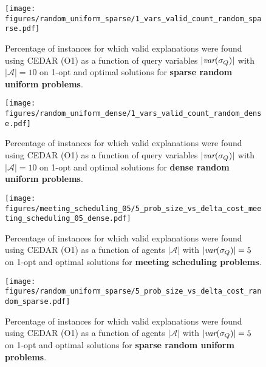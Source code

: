 \documentclass[twoside,11pt]{article}
\begin{document}
\begin{figure}[h]
\centering
\small
\texttt{[image: figures/random\_uniform\_sparse/1\_vars\_valid\_count\_random\_sparse.pdf]} \\ 
\vspace{-0.5em} 
\caption{Percentage of instances for which valid explanations were found using CEDAR (O1) as a function of query variables $|{\textit{var}(\sigma_Q)}|$  with $|\mathcal{A}| = 10$ on 1-opt and optimal solutions for \textbf{sparse random uniform problems}.}
\label{fig:1_results_percent_query_sparse}
\end{figure}

\begin{figure}[h]
\centering
\small
\texttt{[image: figures/random\_uniform\_dense/1\_vars\_valid\_count\_random\_dense.pdf]} \\ 
\vspace{-0.5em} 
\caption{Percentage of instances for which valid explanations were found using CEDAR (O1) as a function of query variables $|{\textit{var}(\sigma_Q)}|$ 
with $|\mathcal{A}| = 10$ on 1-opt and optimal solutions for \textbf{dense random uniform problems}.}
\label{fig:1_results_percent_query_dense}
\end{figure}




\begin{figure}[h]
\centering
\small
\texttt{[image: figures/meeting\_scheduling\_05/5\_prob\_size\_vs\_delta\_cost\_meeting\_scheduling\_05\_dense.pdf]} \\ 
\vspace{-0.5em} 
\caption{Percentage of instances for which valid explanations were found using CEDAR (O1) as a function of agents $|\mathcal{A}|$ with $|{\textit{var}(\sigma_Q)}| = 5$  on 1-opt and optimal solutions for \textbf{meeting scheduling problems}.}
\label{fig:5_results_percent_A_meeting}
\end{figure}

\begin{figure}[h]
\centering
\small
\texttt{[image: figures/random\_uniform\_sparse/5\_prob\_size\_vs\_delta\_cost\_random\_sparse.pdf]} \\ 
\vspace{-0.5em} 
\caption{Percentage of instances for which valid explanations were found using CEDAR (O1) as a function of agents $|\mathcal{A}|$ with $|{\textit{var}(\sigma_Q)}| = 5$  on 1-opt and optimal solutions for \textbf{sparse random uniform problems}.}
\label{fig:5_results_percent_A_sparse}
\end{figure}
\end{document}
